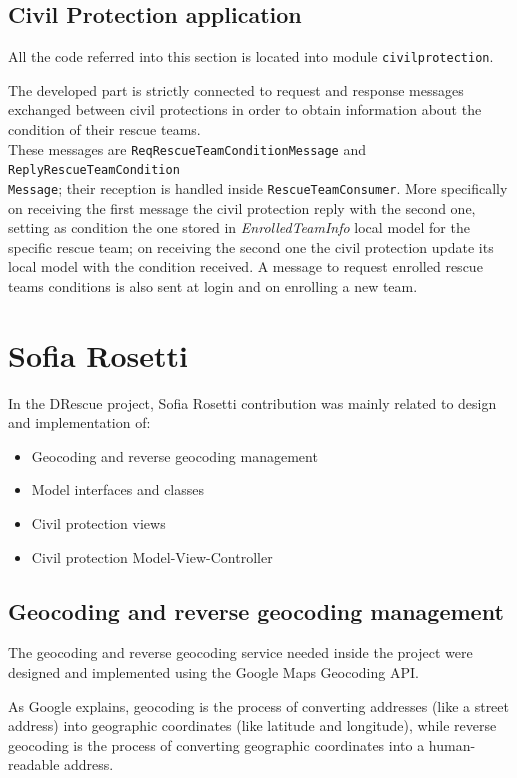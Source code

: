 \documentclass[a4paper,12pt]{report}
\begin{document}
\subsection{Civil Protection application}

All the code referred into this section is located into module \texttt{civilprotection}.

The developed part is strictly connected to request and response messages exchanged between civil protections in order to obtain information about the condition of their rescue teams.
\\These messages are \texttt{ReqRescueTeamConditionMessage} and \texttt{ReplyRescueTeamCondition\\Message}; their reception is handled inside \texttt{RescueTeamConsumer}. More specifically on receiving the first message the civil protection reply with the second one, setting as condition the one stored in \textit{EnrolledTeamInfo} local model for the specific rescue team; on receiving the second one the civil protection update its local model with the condition received.
A message to request enrolled rescue teams conditions is also sent at login and on enrolling a new team.

\section{Sofia Rosetti}
In the DRescue project, Sofia Rosetti contribution was mainly related to design and implementation of:

\begin{itemize}
\item Geocoding and reverse geocoding management
\item Model interfaces and classes
\item Civil protection views
\item Civil protection Model-View-Controller
\end{itemize}

\subsection{Geocoding and reverse geocoding management}
The geocoding and reverse geocoding service needed inside the project were designed and implemented using the Google Maps Geocoding API.

As Google explains, geocoding is the process of converting addresses (like a street address) into geographic coordinates (like latitude and longitude), while reverse geocoding is the process of converting geographic coordinates into a human-readable address.
\end{document}
